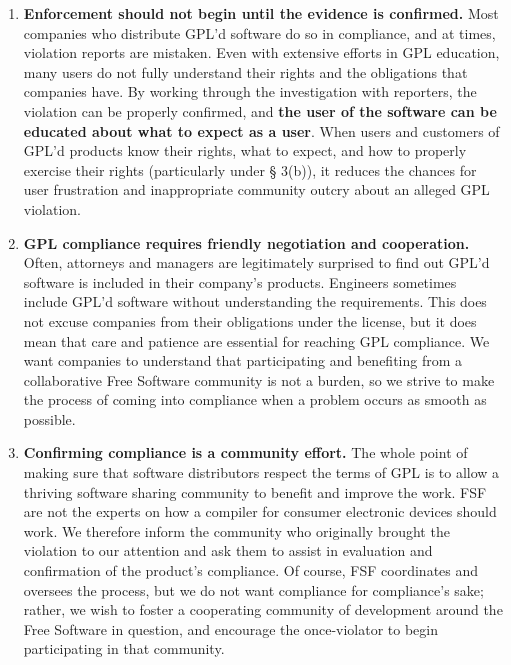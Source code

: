 \documentclass[12pt]{report}
\begin{document}
\begin{enumerate}

\item {\bf Enforcement should not begin until the evidence is confirmed.}
  Most companies who distribute GPL'd software do so in compliance, and at
  times, violation reports are mistaken.  Even with extensive efforts in
  GPL education, many users do not fully understand their rights and the
  obligations that companies have.  By working through the investigation
  with reporters, the violation can be properly confirmed, and {\bf the
    user of the software can be educated about what to expect as a user}.
  When users and customers of GPL'd products know their rights, what to
  expect, and how to properly exercise their rights (particularly under \S
  3(b)), it reduces the chances for user frustration and inappropriate
  community outcry about an alleged GPL violation.

\item {\bf GPL compliance requires friendly negotiation and
  cooperation.}  Often, attorneys and managers are legitimately surprised
  to find out GPL'd software is included in their company's products.
  Engineers sometimes include GPL'd software without understanding the
  requirements.  This does not excuse companies from their obligations
  under the license, but it does mean that care and patience are
  essential for reaching GPL compliance.  We want companies to understand
  that participating and benefiting from a collaborative Free Software
  community is not a burden, so we strive to make the process of coming
  into compliance when a problem occurs as smooth as possible.

\item {\bf Confirming compliance is a community effort.}  The whole point
  of making sure that software distributors respect the terms of GPL is to
  allow a thriving software sharing community to benefit and improve the
  work.  FSF are not the experts on how a compiler for consumer electronic
  devices should work.  We therefore inform the community who originally
  brought the violation to our attention and ask them to assist in
  evaluation and confirmation of the product's compliance.  Of course, FSF
  coordinates and oversees the process, but we do not want compliance for
  compliance's sake; rather, we wish to foster a cooperating community of
  development around the Free Software in question, and encourage the
  once-violator to begin participating in that community.


\end{enumerate}
\end{document}
